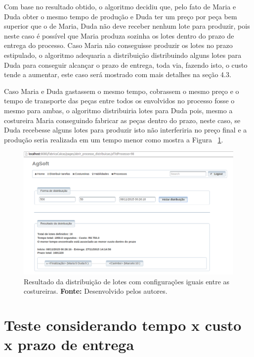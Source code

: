 \par Com base no resultado obtido, o algoritmo decidiu que, pelo fato de
Maria e Duda obter o mesmo tempo de produção e Duda ter um preço por peça
bem superior que o de Maria, Duda não deve receber nenhum lote para produzir, pois neste
caso é possível que Maria produza sozinha os lotes dentro do prazo de entrega do
processo. Caso Maria não conseguisse produzir os lotes no prazo estipulado, o
algoritmo adequaria a distribuição distribuindo alguns lotes para Duda para
conseguir alcançar o prazo de entrega, toda via, fazendo isto, o custo tende a
aumentar, este caso será mostrado com mais detalhes na seção 4.3.

\par Caso Maria e Duda gastassem o mesmo tempo, cobrassem o mesmo preço e o tempo de
transporte das peças entre todos os envolvidos no processo fosse o mesmo para ambas, 
o algoritmo distribuiria lotes para Duda pois, mesmo a costureira Maria
conseguindo fabricar as peças dentro do prazo, neste caso, se Duda recebesse alguns lotes para produzir
isto não interferiria no preço final e a produção seria realizada em um tempo menor como mostra a Figura
~\ref{fig:resultado_tudo_igual}.



\begin{figure}[h!]
	\centerline{\includegraphics[scale=0.3]{./imagens/resultado_tudo_igual_teste2.png}}
	\caption[Resultado da distribuição de lotes com configurações iguais entre as
	costureiras.] 
	{Resultado da distribuição de lotes com configurações iguais entre as
	costureiras. \textbf{Fonte:}
	Desenvolvido pelos autores.}
	\label{fig:resultado_tudo_igual}
\end{figure}

\section{Teste considerando tempo x custo x prazo de entrega}

